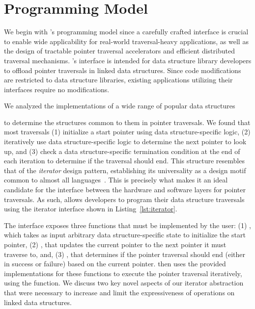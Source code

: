 \section{\pulse Programming Model}
\label{sec:interface}
\label{ssec:iterators}
\label{ssec:iteratorexample}
We begin with \pulse's programming model since a carefully crafted interface is crucial to enable wide applicability for real-world traversal-heavy applications, as well as the design of tractable pointer traversal accelerators and efficient distributed traversal mechanisms. \pulse's interface is intended for data structure library developers to offload pointer traversals in linked data structures. Since \pulse code modifications are restricted to data structure libraries, existing applications utilizing their interfaces require no modifications. 

We analyzed the implementations of a wide range of popular data structures~\cite{stl, boost, javaiterator, c++iterator} 

to determine the structures common to them in pointer traversals. We found that most traversals (1) initialize a start pointer using data structure-specific logic, (2) iteratively use data structure-specific logic to determine the next pointer to look up, and (3) check a data structure-specific termination condition at the end of each iteration to determine if the traversal should end. 
This structure resembles that of the \emph{iterator} design pattern, establishing its universality as a design motif common to almost all languages~\cite{javaiterator}. This is precisely what makes it an ideal candidate for the interface between the hardware and software layers for pointer traversals. As such, \pulse allows developers to program their data structure traversals using the iterator interface shown in Listing~\ref{lst:iterator}. 

The interface exposes three functions that must be implemented by the user: (1) , which takes as input arbitrary data structure-specific state to initialize the start pointer, (2) , that updates the current pointer to the next pointer it must traverse to, and, (3) , that determines if the pointer traversal should end (either in success or failure) based on the current pointer. \pulse then uses the provided implementations for these functions to execute the pointer traversal iteratively, using the  function. We discuss two key novel aspects of our iterator abstraction that were necessary to increase and limit the expressiveness of operations on linked data structures. 

